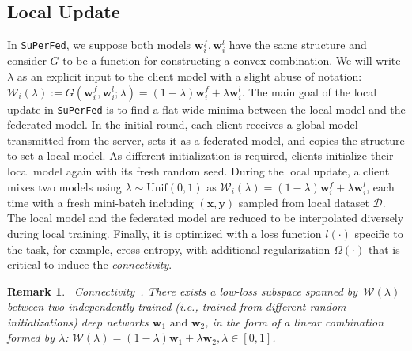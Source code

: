 \documentclass[sigconf]{acmart}
\newtheorem{Remark}{Remark}
\begin{document}
\subsection{Local Update} In \texttt{SuPerFed}, we suppose both models $\mathbf{w}_i^{f}, \mathbf{w}_i^{l}$ have the same structure and consider $G$ to be a function for constructing a convex combination. We will write $\lambda$ as an explicit input to the client model with a slight abuse of notation: $\mathcal{W}_i(\lambda):=G(\mathbf{w}_i^{f}, \mathbf{w}_i^{l};\lambda)=(1-\lambda)\mathbf{w}_i^{f}+\lambda\mathbf{w}_i^{l}$.
The main goal of the local update in \texttt{SuPerFed} is to find a flat wide minima between the local model and the federated model. In the initial round, each client receives a global model transmitted from the server, sets it as a federated model, and copies the structure to set a local model. As different initialization is required, clients initialize their local model again with its fresh random seed.
During the local update, a client mixes two models using $\lambda\sim\text{Unif}(0,1)$ as $\mathcal{W}_i(\lambda)=(1-\lambda)\mathbf{w}_i^{f}+\lambda\mathbf{w}_i^{l}$, each time with a fresh mini-batch including $(\mathbf{x}, \mathbf{y})$ sampled from local dataset $\mathcal{D}$. The local model and the federated model are reduced to be interpolated diversely during local training. Finally, it is optimized with a loss function $l(\cdot)$ specific to the task, for example, cross-entropy, with additional regularization $\Omega(\cdot)$ that is critical to induce the \textit{connectivity}.

\medskip
\begin{Remark}~Connectivity~\cite{frankle20, nnsubspaces}. There exists a low-loss subspace spanned by~$\mathcal{W}(\lambda)$ between two independently trained (i.e., trained from different random initializations) deep networks $\mathbf{w}_1 \text{ and } \mathbf{w}_2$, in the form of a linear combination formed by $\lambda$: $\mathcal{W}(\lambda) = (1 - \lambda)\mathbf{w}_1 + \lambda\mathbf{w}_2, \lambda\in[0, 1]$.
\end{Remark}
\end{document}
